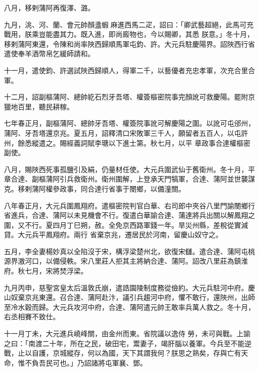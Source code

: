 \begin{pinyinscope}
 八月，移剌蒲阿再復澤、潞。



 九月，洮、河、蘭、會元帥顏盞蝦麻進西馬二疋，詔曰：「卿武藝超絕，此馬可充戰用，朕乘豈能盡其力。既入進，即尚廄物也，今以賜卿，其悉
 朕意。」冬十月，移剌蒲阿東還，令陳和尚率陜西歸順馬軍屯鈞、許。大元兵駐慶陽界。詔陜西行省遣使奉羊酒幣帛乞緩師請和。



 十一月，遣使鈞、許選試陜西歸順人，得軍二千，以藝優者充忠孝軍，次充合里合軍。



 十二月，詔副樞蒲阿、總帥紇石烈牙吾塔、權簽樞密院事完顏訛可救慶陽。罷附京獵地百里，聽民耕稼。



 七年春正月，副樞蒲阿、總帥牙吾塔、權簽院事訛可解慶陽之圍。以訛可屯邠州，蒲阿、牙吾塔還京兆。夏五月，詔釋清口宋敗軍三千人，願留者五百人，以屯許州，餘悉縱遣之。賜經義詞賦李瑭以下進士第。秋七月，以平
 章政事合達權樞密副使。



 八月，賜陜西死事孤鹽引及絹，仍量材任使。大元兵圍武仙于舊衛州。冬十月，平章合達、副樞蒲阿引兵救衛州。衛州圍解，上登承天門犒軍，合達、蒲阿並世襲謀克。移剌蒲阿權參政事，同合達行省事于閿鄉，以備潼關。



 八年春正月，大元兵圍鳳翔府。遣樞密院判官白華、右司郎中夾谷八里門諭閿鄉行省進兵，合達、蒲阿以未見機會不行。復遣白華諭合達、蒲達將兵出關以解鳳翔之圍，又不行。夏四月丁巳朔，赦。全免京西路軍錢一年。旱災州縣，差稅從實減貸。大元兵平鳳翔府。兩行
 省棄京兆，遷居民於河南，留慶山奴守之。



 五月，李全妻楊妙真以全陷沒于宋，構浮梁楚州北，欲復宋讎。遣合達、蒲阿屯桃源界滶河口，以備侵軼。宋八里莊人拒其主將納合達、蒲阿。詔改八里莊為鎮淮府。秋七月，宋將焚浮梁。



 九月丙申，慈聖宮皇太后溫敦氏崩，遣誥園陵制度務從儉約。大元兵駐河中府。慶山奴棄京兆東還。召合達、蒲阿赴汴，議引兵趨河中府，懼不敢行，還陜州，出師至冷水穀而歸。大元兵攻河中府，合達、蒲阿遣元帥王敢率兵萬人救之。冬十月，右丞相賽不致仕。



 十一月丁未，大元進兵嶢峰關，由金州而東。省院議以逸侍
 勞，未可與戰。上諭之曰：「南渡二十年，所在之民，破田宅，鬻妻子，竭肝腦以養軍。今兵至不能逆戰，止以自護，京城縱存，何以為國，天下其謂我何？朕思之熟矣，存與亡有天命，惟不負吾民可也。」乃詔諸將屯軍襄、鄧。




\end{pinyinscope}
